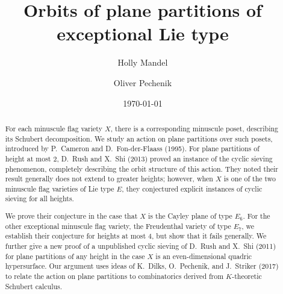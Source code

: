 \documentclass[12pt]{amsart}
\theoremstyle{definition}
\theoremstyle{remark}
\numberwithin{equation}{section}
\begin{document}

\title[Orbits of plane partitions]{Orbits of plane partitions of exceptional Lie type}  

\author[H. Mandel]{Holly Mandel}
\address[HM]{Department of Mathematics, University of California, Berkeley, \linebreak Berkeley, CA 94720}

\author[O. Pechenik]{Oliver Pechenik}
\address[OP]{Department of Mathematics, University of Michigan, Ann Arbor, MI 48109}


\date{\today}




\begin{abstract}
For each minuscule flag variety $X$, there is a corresponding minuscule poset, describing its Schubert decomposition. We study an action on plane partitions over such posets, introduced by P.~Cameron and D.~Fon-der-Flaass (1995).
For plane partitions of height at most $2$, D.~Rush and X.~Shi (2013) proved an instance of the cyclic sieving phenomenon, completely describing the orbit structure of this action. They noted their result generally does not extend to greater heights; however, when $X$ is one of the two minuscule flag varieties of Lie type $E$, they conjectured explicit instances of cyclic sieving for all heights.

We prove their conjecture in the case that $X$ is the Cayley plane of type $E_6$. For the other exceptional minuscule flag variety, the Freudenthal variety of type $E_7$, we establish their conjecture for heights at most $4$, but show that it fails generally. We further give a new proof of a unpublished cyclic sieving of D.~Rush and X.~Shi (2011) for plane partitions of any height in the case $X$ is an even-dimensional quadric hypersurface. 
Our argument uses ideas of K.~Dilks, O.~Pechenik, and J.~Striker (2017) to relate the action on plane partitions to combinatorics derived from $K$-theoretic Schubert calculus. 
\end{abstract}
\end{document}
